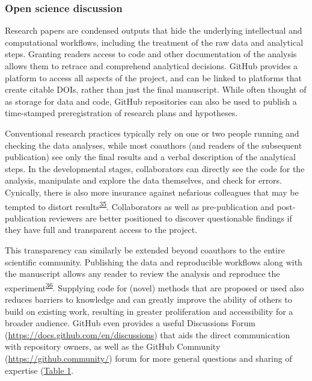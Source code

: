 \hypertarget{open-science-discussion}{%
\subsubsection{Open science discussion}\label{open-science-discussion}}

Research papers are condensed outputs that hide the underlying intellectual and computational workflows, including the treatment of the raw data and analytical steps.
Granting readers access to code and other documentation of the analysis allows them to retrace and comprehend analytical decisions.
GitHub provides a platform to access all aspects of the project, and can be linked to platforms that create citable DOIs, rather than just the final manuscript.
While often thought of as storage for data and code, GitHub repositories can also be used to publish a time-stamped preregistration of research plans and hypotheses.

Conventional research practices typically rely on one or two people running and checking the data analyses, while most coauthors (and readers of the subsequent publication) see only the final results and a verbal description of the analytical steps.
In the developmental stages, collaborators can directly see the code for the analysis, manipulate and explore the data themselves, and check for errors.
Cynically, there is also more insurance against nefarious colleagues that may be tempted to distort results\textsuperscript{\protect\hyperlink{ref-18PTmKJkq}{35}}.
Collaborators as well as pre-publication and post-publication reviewers are better positioned to discover questionable findings if they have full and transparent access to the project.

This transparency can similarly be extended beyond coauthors to the entire scientific community.
Publishing the data and reproducible workflows along with the manuscript allows any reader to review the analysis and reproduce the experiment\textsuperscript{\protect\hyperlink{ref-NOgBWVAr}{36}}.
Supplying code for (novel) methods that are proposed or used also reduces barriers to knowledge and can greatly improve the ability of others to build on existing work, resulting in greater proliferation and accessibility for a broader audience.
GitHub even provides a useful Discussions Forum (\url{https://docs.github.com/en/discussions}) that aids the direct communication with repository owners, as well as the GitHub Community (\url{https://github.community/}) forum for more general questions and sharing of expertise (\protect\hyperlink{tbl:roles}{Table 1}.

